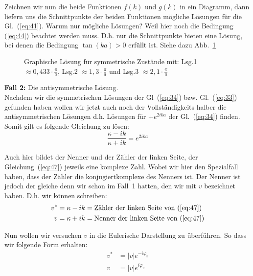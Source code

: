 Zeichnen wir nun die beide Funktionen $f(k)$ und $g(k)$ in ein Diagramm, dann
liefern uns die Schnittpunkte der beiden Funktionen mögliche Lösungen für die
Gl.~(\ref{eq:41}). Warum nur mögliche Lösungen? Weil hier noch die Bedingung
(\ref{eq:44}) beachtet werden muss. D.h. nur die Schnittpunkte bieten eine
Lösung, bei denen die Bedingung $\tan(ka)>0$ erfüllt ist. Siehe dazu Abb.~\ref{fig:9}

\begin{figure}[!ht]
  \begin{center}
    
    \caption{Graphische Lösung für symmetrische Zustände mit: 
      Lsg.1 $\approx 0,433\cdot \frac \pi a $,  
      Lsg.2 $\approx 1,3\cdot \frac \pi a $ und  
      Lsg.3 $\approx 2,1\cdot \frac \pi a $ }
    \label{fig:9}
  \end{center}
\end{figure}

 \textbf{Fall 2:} Die antisymmetrische Lösung.\\
Nachdem wir die symmetrischen Lösungen der Gl~(\ref{eq:34}) bzw. 
Gl.~(\ref{eq:33})  gefunden haben wollen wir jetzt auch noch der
Vollständigkeits halber die antisymmetrischen Lösungen d.h. Lösungen für
$+e^{2ika}$ der Gl.~(\ref{eq:34}) finden. Somit gilt es folgende Gleichung zu
lösen:
\begin{equation}
  \label{eq:47}
  \frac{\kappa-ik}{\kappa+ik}=e^{2ika}
\end{equation}

Auch hier bildet der Nenner und der Zähler der linken Seite, der
Gleichung~(\ref{eq:47}) jeweils eine komplexe Zahl. Wobei wir hier den
Spezialfall haben, dass der Zähler die konjugiertkomplexe des Nenners ist. Der
Nenner ist jedoch der gleiche denn wir schon im Fall~1 hatten, den wir mit $v$
bezeichnet haben. D.h. wir können schreiben:
\begin{align*}
  v^*&=\kappa-ik = \text{Zähler der linken Seite von (\ref{eq:47})}\\
  v&=\kappa+ik = \text{Nenner der linken Seite von (\ref{eq:47})}
\end{align*}

Nun wollen wir versuchen $v$ in die Eulerische Darstellung zu überführen. So
dass wir folgende Form erhalten:
\begin{subequations}
\begin{align}
  v^*&=|v|e^{-i\varphi_v}\label{eq:48a}\\
  v&=|v|e^{i\varphi_v}\label{eq:48b}
\end{align}
\end{subequations}

